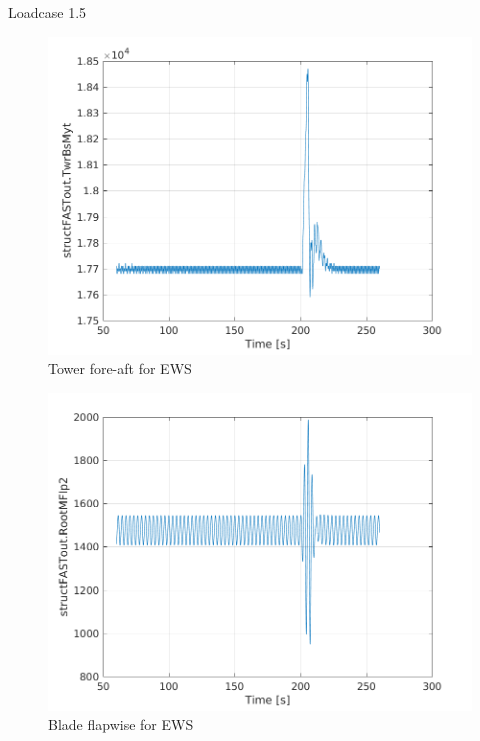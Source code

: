 \documentclass[12pt,t]{beamer}
\begin{document}
\begin{frame}
\huge
Loadcase 1.5
\begin{figure}[H]
  \centering
\begin{minipage}{0.40\textwidth}
  \includegraphics[width=1\linewidth]{../CIP_6/FASTextreme/EWSVR/TwrBsMyt.png}\\
      \centering
        \footnotesize
    Tower fore-aft for EWS
\end{minipage}
\begin{minipage}{0.40\textwidth}
  \includegraphics[width=1\linewidth]{../CIP_6/FASTextreme/EWSVR/RootMFlp2.png}\\
      \centering
        \footnotesize
    Blade flapwise for EWS
\end{minipage}
\end{figure}
\end{frame}
\end{document}
